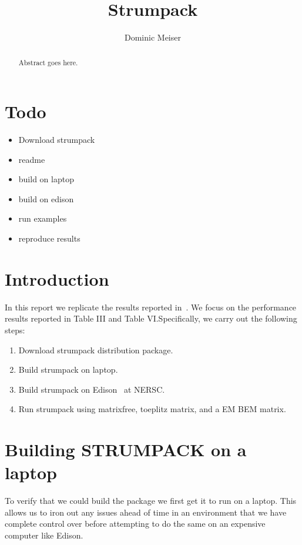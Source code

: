 \documentclass{acmsmall}
\begin{document}
\title{Strumpack}
\author{Dominic Meiser
}


\begin{abstract}
Abstract goes here.
\end{abstract}

\maketitle 

\section{Todo}

\begin{itemize}
  \item Download strumpack
  \item readme
  \item build on laptop
  \item build on edison
  \item run examples
  \item reproduce results

\end{itemize}

\section{Introduction}

In this report we replicate the results reported
in~\cite{strumpackpaper}.  We focus on the performance results
reported in Table III and Table VI.\@  Specifically, we carry out
the following steps:

\begin{enumerate}
  \item Download strumpack distribution package.
  \item Build strumpack on laptop.
  \item Build strumpack on Edison~\cite{Edison} at NERSC.
  \item Run strumpack using matrixfree, toeplitz matrix, and a EM
    BEM matrix.
\end{enumerate}


\section{Building STRUMPACK on a laptop}

To verify that we could build the package we first get it to run
on a laptop.  This allows us to iron out any issues ahead of time
in an environment that we have complete control over before
attempting to do the same on an expensive computer like Edison.
\end{document}
